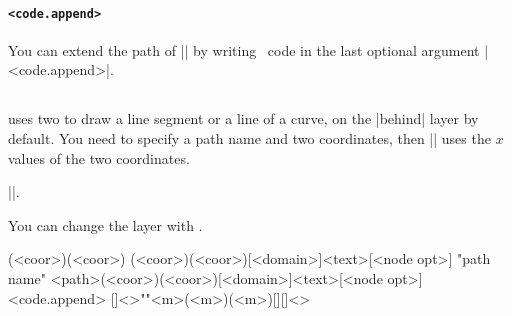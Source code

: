 \begin{tzcode}{.3}
\end{tzcode}

\paragraph{\texttt{<code.append>}}
You can extend the path of |\tzsecantat| by writing \Tikz\ code in the last optional argument |<code.append>|.

\begin{tzcode}{.3}
\end{tzcode}



\subsection{\protect\cmd{\tzsecant}}
\label{ss:tzsecant}

\icmd{\tzsecant} uses two  to draw a line segment or a  line of a curve, on the |behind| layer by default.
You need to specify a path name and two coordinates, then |\tzsecant| uses the $x$ values of the two coordinates.

 |\tzsecantat|.

You can change the layer with \icmd{\settzsecantlayer}.

\begin{tzdef}
(<coor>)(<coor>)
(<coor>)(<coor>)[<domain>]{<text>}[<node opt>]
"path name"
           {<path>}(<coor>)(<coor>)[<domain>]{<text>}[<node opt>]<code.append>
  []<>""{<m>}(<m>)(<m>)[]{}[]<>
\end{tzdef}


